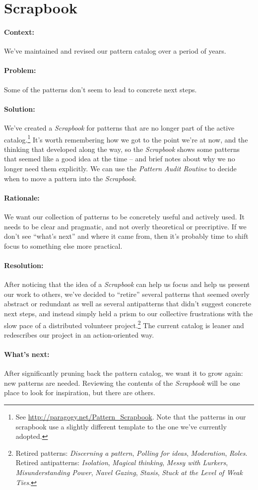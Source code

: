 \section{Scrapbook}

\paragraph{Context:} We've maintained and revised our pattern catalog over a period of years.

\paragraph{Problem:} Some of the patterns don't seem to lead to concrete next steps.

\paragraph{Solution:} We've created a \emph{Scrapbook} for patterns that are no longer part of the active catalog.\footnote{See \url{http://paragogy.net/Pattern_Scrapbook}.  Note that the patterns in our scrapbook use a slightly different template to the one we've currently adopted.}  It's worth remembering how we got to the point we're at now, and the thinking that developed along the way, so the \emph{Scrapbook} shows some patterns that seemed like a good idea at the time -- and brief notes about why we no longer need them explicitly.  We can use the \emph{Pattern Audit Routine} to decide when to move a pattern into the \emph{Scrapbook}.

\paragraph{Rationale:} We want our collection of patterns to be concretely useful and actively used.  It needs to be clear and pragmatic, and not overly theoretical or precriptive.  If we don't see ``what's next'' and where it came from, then it's probably time to shift focus to something else more practical.

\paragraph{Resolution:}  After noticing that the idea of a \emph{Scrapbook} can help us focus and help us present our work to others, we've decided to ``retire'' several patterns that seemed overly abstract or redundant as well as several antipatterns that didn't suggest concrete next steps, and instead simply held a prism to our collective frustrations with the slow pace of a distributed volunteer project.\footnote{Retired patterns: \emph{Discerning a pattern}, \emph{Polling for ideas}, \emph{Moderation}, \emph{Roles}. Retired antipatterns: \emph{Isolation}, \emph{Magical thinking}, \emph{Messy with Lurkers}, \emph{Misunderstanding Power}, \emph{Navel Gazing}, \emph{Stasis}, \emph{Stuck at the Level of Weak Ties}.}  The current catalog is leaner and redescribes our project in an action-oriented way. 

\paragraph{What's next:} After significantly pruning back the pattern catalog, we want it to grow again: new patterns are needed.  Reviewing the contents of the \emph{Scrapbook} will be one place to look for inspiration, but there are others.

